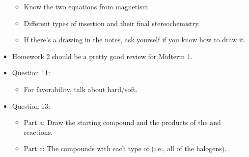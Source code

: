 \documentclass[../notes.tex]{subfiles}
\begin{document}
\begin{itemize}
\begin{itemize}
        \item Know the two equations from magnetism.
        \item Different types of insertion and their final stereochemistry.
        \item If there's a drawing in the notes, ask yourself if you know how to draw it.
    \end{itemize}
    \item Homework 2 should be a pretty good review for Midterm 1.
    \item Question 11:
    \begin{itemize}
        \item For favorability, talk about hard/soft.
    \end{itemize}
    \item Question 13:
    \begin{itemize}
        \item Part a: Draw the starting compound and the products of the  and  reactions.
        \item Part c: The compounds with each type of  (i.e., all of the halogens).
    \end{itemize}
\end{itemize}
\end{document}
